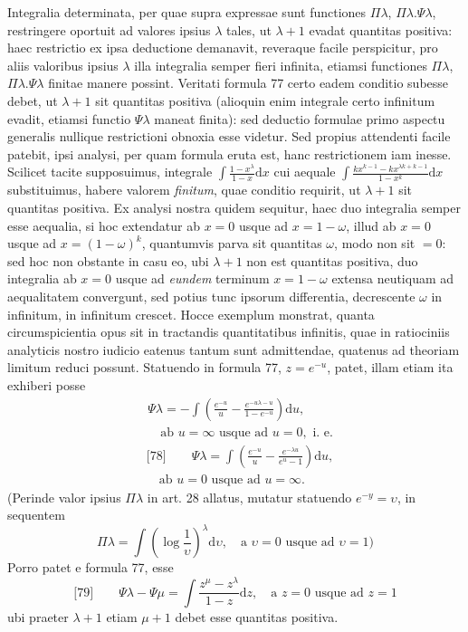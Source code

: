 Integralia determinata, per quae supra expressae sunt functiones $\Pi\lambda$, $\Pi\lambda.\Psi\lambda$, restringere oportuit ad valores ipsius $\lambda$ tales, ut $\lambda+1$ evadat quantitas positiva: haec restrictio ex ipsa deductione demanavit, reveraque facile perspicitur, pro aliis valoribus ipsius $\lambda$ illa integralia semper fieri infinita, etiamsi functiones $\Pi\lambda$, $\Pi\lambda.\Psi\lambda$ finitae manere possint. Veritati formula 77 certo eadem conditio subesse debet, ut $\lambda+1$ sit quantitas positiva (alioquin enim integrale certo infinitum evadit, etiamsi functio $\Psi\lambda$ maneat finita): sed deductio formulae primo aspectu generalis nullique restrictioni obnoxia esse videtur. Sed propius attendenti facile patebit, ipsi analysi, per quam formula eruta est, hanc restrictionem iam inesse. Scilicet tacite supposuimus, integrale $\int\frac{1-x^\lambda}{1-x}\mathrm{d}x$ cui aequale $\int\frac{kx^{k-1}-kx^{\lambda k+k-1}}{1-x^k}\mathrm{d}x$ substituimus, habere valorem \emph{finitum}, quae conditio requirit, ut $\lambda+1$ sit quantitas positiva. Ex analysi nostra quidem sequitur, haec duo integralia semper esse aequalia, si hoc extendatur ab $x=0$ usque ad $x=1-\omega$, illud ab $x=0$ usque ad $x=(1-\omega)^k$, quantumvis parva sit quantitas $\omega$, modo non sit $=0$: sed hoc non obstante in casu eo, ubi $\lambda+1$ non est quantitas positiva, duo integralia ab $x=0$ usque ad \emph{eundem} terminum $x=1-\omega$ extensa neutiquam ad aequalitatem convergunt, sed potius tunc ipsorum differentia, decrescente $\omega$ in infinitum, in infinitum crescet. Hocce exemplum monstrat, quanta circumspicientia opus sit in tractandis quantitatibus infinitis, quae in ratiociniis analyticis nostro iudicio eatenus tantum sunt admittendae, quatenus ad theoriam limitum reduci possunt.
Statuendo in formula 77, $z=e^{-u}$, patet, illam etiam ita exhiberi posse
\[
\begin{aligned}
&\Psi\lambda=-\int\left(\frac{e^{-u}}{u}-\frac{e^{-u\lambda-u}}{1-e^{-u}}\right)\mathrm{d}u,
\\[4pt]
&\quad\text{ab }u=\infty\text{ usque ad }u=0,\text{ i. e.}
\end{aligned}
\]
\[
\begin{aligned}
&\text{[78]}\qquad
\Psi\lambda=\int\left(\frac{e^{-u}}{u}-\frac{e^{-\lambda u}}{e^u-1}\right)\mathrm{d}u,
\\[4pt]
&\quad\text{ab }u=0\text{ usque ad }u=\infty.
\end{aligned}
\]
(Perinde valor ipsius $\Pi\lambda$ in art. 28 allatus, mutatur statuendo
$e^{-y}=\upsilon$, in sequentem
\[
\Pi\lambda=\int\left(\log\frac{1}{\upsilon}\right)^\lambda\mathrm{d}\upsilon,
\quad\text{a }\upsilon=0\text{ usque ad }\upsilon=1)
\]
Porro patet e formula 77, esse
\[
\text{[79]}\qquad
\Psi\lambda-\Psi\mu=\int\frac{z^\mu-z^\lambda}{1-z}\mathrm{d}z,
\quad\text{a }z=0\text{ usque ad }z=1
\]
ubi praeter $\lambda+1$ etiam $\mu+1$ debet esse quantitas positiva.

